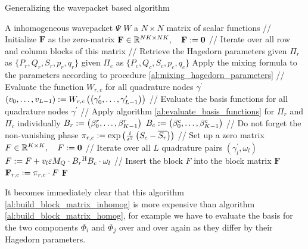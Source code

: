 \begin{chapter}{Generalizing the wavepacket based algorithm}
\begin{algorithm}
\caption{Build the inhomogeneous block matrix $\mathbf{F} \assign \left(F_{r,c}\right)_{r,c}$}
\label{al:build_block_matrix_inhomog}
\begin{algorithmic}
  \REQUIRE A inhomogeneous wavepacket $\Psi$
  \REQUIRE $W$ a $N \times N$ matrix of scalar functions
  \STATE // Initialize $\mathbf{F}$ as the zero-matrix
  \STATE $\mathbf{F} \in \mathbb{R}^{NK \times NK}, \quad \mathbf{F} := \mathbf{0}$
  \STATE // Iterate over all row and column blocks of this matrix
      \STATE // Retrieve the Hagedorn parameters
      \STATE given $\Pi_r$ as $\{P_r,Q_r,S_r,p_r,q_r\}$
      \STATE given $\Pi_c$ as $\{P_c,Q_c,S_c,p_c,q_c\}$
      \STATE Apply the mixing formula to the parameters according to procedure \ref{al:mixing_hagedorn_parameters}
      \STATE // Evaluate the function $W_{r,c}$ for all quadrature nodes $\gamma^\prime$
      \STATE $\left(v_0, \ldots, v_{L-1}\right) := W_{r,c}\left( \left(\gamma^\prime_0, \ldots, \gamma^\prime_{L-1}\right) \right)$
      \STATE // Evaluate the basis functions for all quadrature nodes $\gamma^\prime$
      \STATE // Apply algorithm \ref{al:evaluate_basis_functions} for $\Pi_r$ and $\Pi_c$ individually
      \STATE $B_r := \left(\beta^r_0, \ldots, \beta^r_{K-1}\right)$
      \STATE $B_c := \left(\beta^c_0, \ldots, \beta^c_{K-1}\right)$
      \STATE // Do not forget the non-vanishing phase
      \STATE $\pi_{r,c} := \exp\left( \frac{i}{\varepsilon^2}\left(S_c - \overline{S_r}\right) \right)$
      \STATE // Set up a zero matrix
      \STATE $F \in \mathbb{R}^{K \times K}, \quad F := \mathbf{0}$
      \STATE // Iterate over all $L$ quadrature pairs $\left(\gamma^\prime_l, \omega_l\right)$
        \STATE $F := F + v_l \varepsilon M_Q \cdot B_r{}^{\textnormal{H}} B_c \cdot \omega_l$
      \ENDFOR
      \STATE // Insert the block $F$ into the block matrix $\mathbf{F}$
      \STATE $\mathbf{F}_{r,c} := \pi_{r,c} \cdot F$
    \ENDFOR
  \ENDFOR
  \RETURN $\mathbf{F}$
\end{algorithmic}
\end{algorithm}

It becomes immediately clear that this algorithm \ref{al:build_block_matrix_inhomog}
is more expensive than algorithm \ref{al:build_block_matrix_homog}, for example we have to
evaluate the basis for the two components $\Phi_i$ and $\Phi_j$ over and over again
as they differ by their Hagedorn parameters.


\end{chapter}
